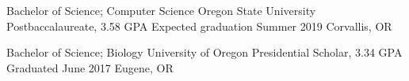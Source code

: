 \showoff
{Bachelor of Science; Computer Science}
{Oregon State University Postbaccalaureate, 3.58 GPA}
{Expected graduation Summer 2019}
{Corvallis, OR}

\myBreak

\showoff
{Bachelor of Science; Biology}
{University of Oregon Presidential Scholar, 3.34 GPA}
{Graduated June 2017}
{Eugene, OR}

\medbreak
